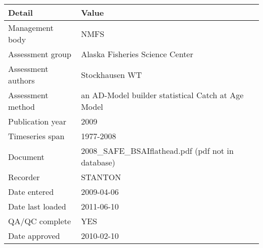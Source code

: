 \begin{table}[htb]
\centering
\begin{tabular}{lp{7cm}}
\toprule
Detail & Value \\
\midrule
Management body    & NMFS                                               \\
Assessment group   & Alaska Fisheries Science Center                    \\
Assessment authors & Stockhausen WT                                     \\
Assessment method  & an AD-Model builder statistical Catch at Age Model \\
Publication year   & 2009                                               \\
Timeseries span    & 1977-2008                                          \\
Document           & 2008\_SAFE\_BSAIflathead.pdf (pdf not in database) \\
Recorder           & STANTON                                            \\
Date entered       & 2009-04-06                                         \\
Date last loaded   & 2011-06-10                                         \\
QA/QC complete     & YES                                                \\
Date approved      & 2010-02-10                                         \\
\bottomrule
\end{tabular}
\label{tab:assessdet}
\end{table}
